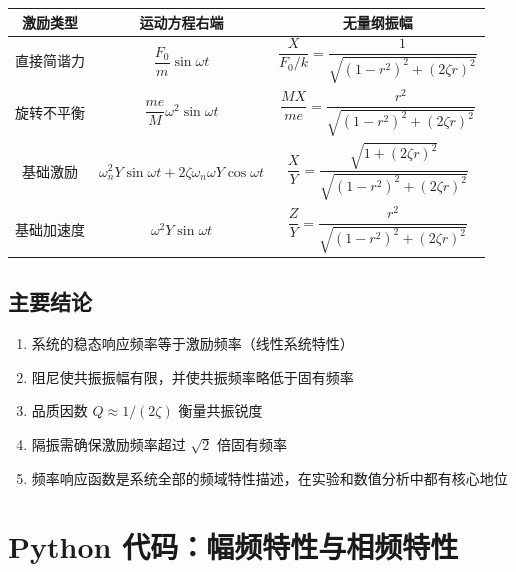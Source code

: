 \begin{center}
\begin{tabular}{c|c|c}
\hline
\textbf{激励类型} & \textbf{运动方程右端} & \textbf{无量纲振幅} \\
\hline
直接简谐力 & $\dfrac{F_0}{m}\sin\omega t$ & $\dfrac{X}{F_0/k} = \dfrac{1}{\sqrt{(1-r^2)^2+(2\zeta r)^2}}$ \\
\hline
旋转不平衡 & $\dfrac{me}{M}\omega^2\sin\omega t$ & $\dfrac{MX}{me} = \dfrac{r^2}{\sqrt{(1-r^2)^2+(2\zeta r)^2}}$ \\
\hline
基础激励 & $\omega_n^2 Y\sin\omega t + 2\zeta\omega_n\omega Y\cos\omega t$ & $\dfrac{X}{Y} = \dfrac{\sqrt{1+(2\zeta r)^2}}{\sqrt{(1-r^2)^2+(2\zeta r)^2}}$ \\
\hline
基础加速度 & $\omega^2 Y\sin\omega t$ & $\dfrac{Z}{Y} = \dfrac{r^2}{\sqrt{(1-r^2)^2+(2\zeta r)^2}}$ \\
\hline
\end{tabular}
\end{center}

\subsection{主要结论}

\begin{enumerate}
    \item 系统的稳态响应频率等于激励频率（线性系统特性）
    \item 阻尼使共振振幅有限，并使共振频率略低于固有频率
    \item 品质因数 $Q \approx 1/(2\zeta)$ 衡量共振锐度
    \item 隔振需确保激励频率超过 $\sqrt{2}$ 倍固有频率
    \item 频率响应函数是系统全部的频域特性描述，在实验和数值分析中都有核心地位
\end{enumerate}

\section{Python 代码：幅频特性与相频特性}

